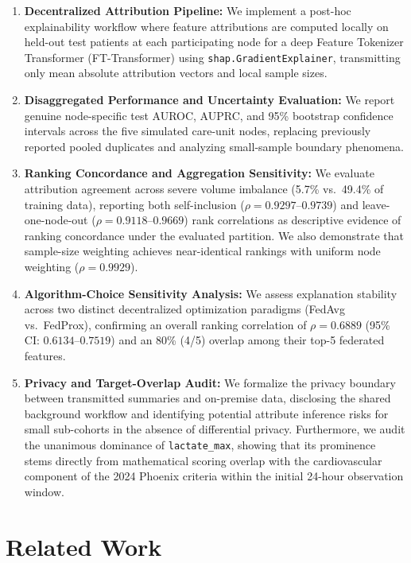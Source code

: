 \documentclass[sigconf,review,anonymous]{acmart}
\begin{document}
\begin{enumerate}
\item \textbf{Decentralized Attribution Pipeline:} We implement a post-hoc explainability workflow where feature attributions are computed locally on held-out test patients at each participating node for a deep Feature Tokenizer Transformer (FT-Transformer) using \texttt{shap.GradientExplainer}, transmitting only mean absolute attribution vectors and local sample sizes.
\item \textbf{Disaggregated Performance and Uncertainty Evaluation:} We report genuine node-specific test AUROC, AUPRC, and 95\% bootstrap confidence intervals across the five simulated care-unit nodes, replacing previously reported pooled duplicates and analyzing small-sample boundary phenomena.
\item \textbf{Ranking Concordance and Aggregation Sensitivity:} We evaluate attribution agreement across severe volume imbalance (5.7\% vs.\ 49.4\% of training data), reporting both self-inclusion ($\rho = 0.9297$--$0.9739$) and leave-one-node-out ($\rho = 0.9118$--$0.9669$) rank correlations as descriptive evidence of ranking concordance under the evaluated partition. We also demonstrate that sample-size weighting achieves near-identical rankings with uniform node weighting ($\rho = 0.9929$).
\item \textbf{Algorithm-Choice Sensitivity Analysis:} We assess explanation stability across two distinct decentralized optimization paradigms (FedAvg vs.\ FedProx), confirming an overall ranking correlation of $\rho = 0.6889$ (95\% CI: $0.6134$--$0.7519$) and an 80\% (4/5) overlap among their top-5 federated features.
\item \textbf{Privacy and Target-Overlap Audit:} We formalize the privacy boundary between transmitted summaries and on-premise data, disclosing the shared background workflow and identifying potential attribute inference risks for small sub-cohorts in the absence of differential privacy. Furthermore, we audit the unanimous dominance of \texttt{lactate\_max}, showing that its prominence stems directly from mathematical scoring overlap with the cardiovascular component of the 2024 Phoenix criteria within the initial 24-hour observation window.
\end{enumerate}

\section{Related Work}\label{sec:litreview}
\end{document}

